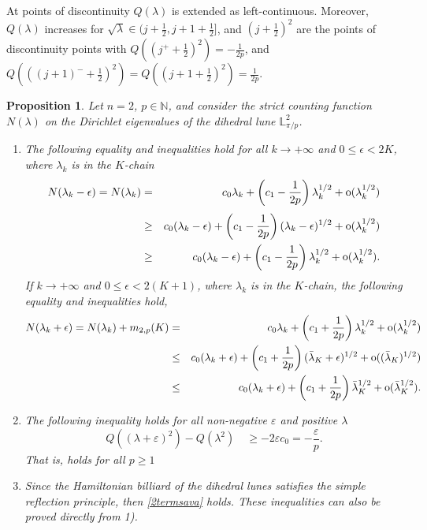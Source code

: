 \documentclass[11pt,a4paper,times]{amsart}
\theoremstyle{plain}
\newtheorem{proposition}{Proposition}[section]
\theoremstyle{definition}
\numberwithin{equation}{section}
\newcommand{\ci}{c_{1}}
\newcommand{\N}{\mathbb{N}}
\newcommand{\so}{{\rm o}}
\newcommand{\lune}[2]{\mathbb{L}^{#1}_{#2}}
\begin{document}
{ At points of discontinuity $Q(\lambda)$ is extended as left-continuous. Moreover, 
   $Q(\lambda)$ increases for  $\sqrt{\lambda}\in (j +\frac{1}{2}, j+1 + \frac{1}{2}]$, and $(j +\frac{1}{2})^2$ are the points of
   discontinuity points  with  $Q((j^++\frac{1}{2})^2)=-\frac{1}{2p}$,  and  $Q(((j+1)^{-}+\frac{1}{2})^2)= Q((j+1+\frac{1}{2})^2)=\frac{1}{2p}$.
%
%
\begin{proposition} Let $n=2$, $p\in \N$, and consider the  strict counting function $N(\lambda)$ on the Dirichlet eigenvalues of the dihedral lune $\lune{2}{\pi/p}$.
\begin{enumerate}[{\rm 1)}]
\item The following equality and inequalities hold  for all $k\to +\infty$ and $0\leq \epsilon<2K$, where $\lambda_k$ is in the $K$-chain
\begin{eqnarray*}
N(\lambda_k-\epsilon)=N(\lambda_k)
&=& c_0\lambda_k+ \left( \ci -\frac{1}{2p}\right)\lambda_k^{1/2}+
\so(\lambda_k^{1/2})\nonumber \\[1mm]
&\geq &c_0(\lambda_k-\epsilon)+ \left(\ci -\frac{1}{2p}\right)(\lambda_k-\epsilon)^{1/2}+\so(\lambda_k^{1/2})\label{N1}\\
&\geq &c_0(\lambda_k-\epsilon)+ \left(\ci -\frac{1}{2p}\right)\lambda_k^{1/2}+\so(\lambda_k^{1/2}).\nonumber
\end{eqnarray*}
 If $k\to +\infty$ and $0\leq \epsilon<2(K+1)$, where $\lambda_k$ is in the $K$-chain, the following equality and inequalities hold, 
 \begin{eqnarray*}
N(\lambda_k+\epsilon)=
N(\lambda_k)+ m_{2,p}(K) &=&  c_0\lambda_k+ \left( \ci +\frac{1}{2p}\right)\lambda_k^{1/2}+\so(\lambda_k^{1/2})\\
&\leq& c_0(\lambda_k+\epsilon)+\left( \ci +\frac{1}{2p}\right)(\bar{\lambda}_K+\epsilon)^{1/2}+\so((\bar{\lambda}_K)^{1/2})\\
&\leq& c_0(\lambda_k+\epsilon)+\left( \ci +\frac{1}{2p}\right)\bar{\lambda}_K^{1/2}+
\so(\bar{\lambda}_K^{1/2}).
\end{eqnarray*}
\item The following inequality holds for all non-negative $\varepsilon$ and positive $\lambda$
 \[Q((\lambda+\varepsilon)^2)-Q(\lambda^2)\quad \geq -2\varepsilon c_0=-\frac{\varepsilon}{p}.
\]
That is, \cite[(1.7.2), p. 50]{sava} holds for all $p\geq 1$ 
\item Since the Hamiltonian billiard of the dihedral lunes satisfies the simple reflection principle, then \eqref{2termsava} holds. These inequalities can also be proved directly from {\rm 1)}.

\end{enumerate}
\end{proposition}}
\end{document}
